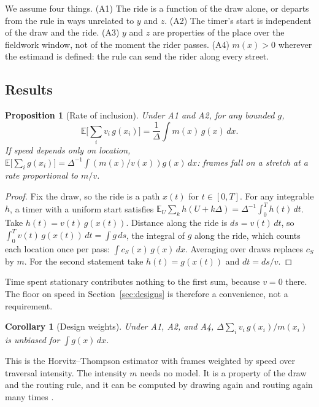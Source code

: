 \documentclass[11pt]{article}
\newtheorem{proposition}{Proposition}
\newtheorem{corollary}{Corollary}
\begin{document}
We assume four things. (A1) The ride is a function of the draw alone, or departs from the rule in ways unrelated to $y$ and $z$. (A2) The timer's start is independent of the draw and the ride. (A3) $y$ and $z$ are properties of the place over the fieldwork window, not of the moment the rider passes. (A4) $m(x) > 0$ wherever the estimand is defined: the rule can send the rider along every street.

\subsection{Results}

\begin{proposition}[Rate of inclusion]
\label{prop:rate}
Under A1 and A2, for any bounded $g$,
\begin{equation}
    \mathbb{E}\Big[\sum_i v_i\, g(x_i)\Big] = \frac{1}{\Delta} \int m(x)\, g(x)\, dx .
\end{equation}
If speed depends only on location, $\mathbb{E}\big[\sum_i g(x_i)\big] = \Delta^{-1} \int \left(m(x)/v(x)\right) g(x)\, dx$: frames fall on a stretch at a rate proportional to $m/v$.
\end{proposition}

\begin{proof}
Fix the draw, so the ride is a path $x(t)$ for $t \in [0, T]$. For any integrable $h$, a timer with a uniform start satisfies $\mathbb{E}_U \sum_k h(U + k\Delta) = \Delta^{-1} \int_0^T h(t)\, dt$. Take $h(t) = v(t)\, g(x(t))$. Distance along the ride is $ds = v(t)\, dt$, so $\int_0^T v(t)\, g(x(t))\, dt = \int g\, ds$, the integral of $g$ along the ride, which counts each location once per pass: $\int c_S(x)\, g(x)\, dx$. Averaging over draws replaces $c_S$ by $m$. For the second statement take $h(t) = g(x(t))$ and $dt = ds / v$.
\end{proof}

Time spent stationary contributes nothing to the first sum, because $v = 0$ there. The floor on speed in Section~\ref{sec:designs} is therefore a convenience, not a requirement.

\begin{corollary}[Design weights]
\label{cor:design}
Under A1, A2, and A4, $\Delta \sum_i v_i\, g(x_i) / m(x_i)$ is unbiased for $\int g(x)\, dx$.
\end{corollary}

This is the Horvitz--Thompson estimator with frames weighted by speed over traversal intensity. The intensity $m$ needs no model. It is a property of the draw and the routing rule, and it can be computed by drawing again and routing again many times \citep{fattorini2006inclusion}.
\end{document}
